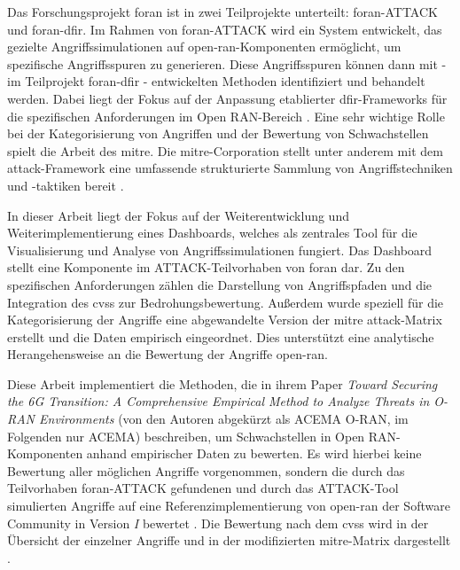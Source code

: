 \par Das Forschungsprojekt \gls{foran} ist in zwei Teilprojekte unterteilt: \gls{foran}-ATTACK und \gls{foran}-\gls{dfir}. Im Rahmen von \gls{foran}-ATTACK wird ein System entwickelt, das gezielte Angriffssimulationen auf \gls{open-ran}-Komponenten ermöglicht, um spezifische Angriffsspuren zu generieren. Diese Angriffsspuren können dann mit - im Teilprojekt \gls{foran}-\gls{dfir} - entwickelten Methoden identifiziert und behandelt werden. Dabei liegt der Fokus auf der Anpassung etablierter \gls{dfir}-Frameworks für die spezifischen Anforderungen im Open RAN-Bereich \autocite{5GFORAN}. Eine sehr wichtige Rolle bei der Kategorisierung von Angriffen und der Bewertung von Schwachstellen spielt die Arbeit des \gls{mitre}. Die \gls{mitre}-Corporation stellt unter anderem mit dem \gls{attack}-Framework eine umfassende strukturierte Sammlung von Angriffstechniken und -taktiken bereit \autocite{MITREATTCK} \autocite{SolvingProblemsSafer2024}.
\par
In dieser Arbeit liegt der Fokus auf der Weiterentwicklung und Weiterimplementierung eines Dashboards, welches als zentrales Tool für die Visualisierung und Analyse von Angriffssimulationen fungiert. Das Dashboard stellt eine Komponente im ATTACK-Teilvorhaben von \gls{foran} dar. Zu den spezifischen Anforderungen zählen die Darstellung von Angriffspfaden und die Integration des \gls{cvss} zur Bedrohungsbewertung. Außerdem wurde speziell für die Kategorisierung der Angriffe eine abgewandelte Version der \gls{mitre} \gls{attack}-Matrix erstellt und die Daten empirisch eingeordnet. Dies unterstützt eine analytische Herangehensweise an die Bewertung der Angriffe \gls{open-ran}\autocite{dieterichDevelopmentAdversarySimulation}.
\par
Diese Arbeit implementiert die Methoden, die \citeauthor{klementSecuring6GTransition2024} in ihrem Paper \textit{Toward Securing the 6G Transition: A Comprehensive Empirical Method to  Analyze Threats in O-RAN Environments} (von den Autoren abgekürzt als ACEMA O-RAN, im Folgenden nur ACEMA) beschreiben, um Schwachstellen in Open RAN-Komponenten anhand empirischer Daten zu bewerten. Es wird hierbei keine Bewertung aller möglichen Angriffe vorgenommen, sondern die durch das Teilvorhaben \gls{foran}-ATTACK gefundenen und durch das ATTACK-Tool simulierten Angriffe auf eine Referenzimplementierung von \gls{open-ran} der \oran Software Community in Version \textit{I} bewertet . Die Bewertung nach dem \gls{cvss} wird in der Übersicht der einzelner Angriffe und in der modifizierten \gls{mitre}-Matrix dargestellt \autocite{dieterichDevelopmentAdversarySimulation,klementSecuring6GTransition2024}.
